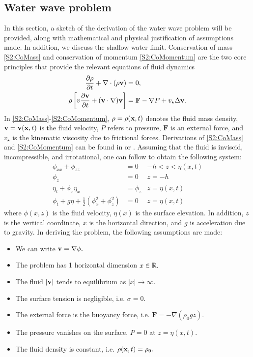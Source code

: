 \documentclass[11pt,reqno,oneside,a4paper]{article}
\begin{document}
\subsection{Water wave problem}
In this section, a sketch of the derivation of the water wave problem will be provided, along with mathematical and physical justification of assumptions made. In addition, we discuss the shallow water limit. Conservation of mass \eqref{S2:CoMass} and conservation of momentum \eqref{S2:CoMomentum} are the two core principles that provide the relevant equations of fluid dynamics
\begin{align}
\frac{\partial \rho}{\partial t} + \nabla \cdot (\rho {\bf v}) &= 0, \label{S2:CoMass} \\
\rho\left[ v\frac{\partial {\bf v}}{\partial t} + ({\bf v} \cdot \nabla) {\bf v}\right] &= \textbf{F} - \nabla P + v_{\star} \Delta {\bf v}. \label{S2:CoMomentum}
\end{align}
In \eqref{S2:CoMass}-\eqref{S2:CoMomentum}, $\rho = \rho({\bf x}, t)$ denotes the fluid mass density, ${\bf v} = {\bf v}({\bf x},t)$ is the fluid velocity, $P$ refers to pressure, $\textbf{F}$ is an external force, and $v_{\star}$ is the kinematic viscosity due to frictional forces. Derivations of \eqref{S2:CoMass} and \eqref{S2:CoMomentum} can be found in \cite[Chapter 3]{Johnson} or \cite[Chapter 1]{CM}. Assuming that the fluid is inviscid, incompressible, and irrotational, one can follow \cite[Section 5.1]{Ablowitz} to obtain the following system:
\begin{subequations} \label{S2:DimWholeLineProblem}
\begin{align}
\phi_{xx} + \phi_{zz} &= 0 &-h < z < \eta(x,t) \label{S2:PDE}\\
\phi_{z} &= 0 &z = -h \label{S2:BBC}\\
\eta_t + \phi_{x}\eta_{x} &= \phi_{z} & z = \eta(x,t) \label{S2:KBC}\\
\phi_t + g\eta + \frac{1}{2}(\phi_{x}^2 + \phi_{z}^2) &= 0 &z = \eta(x,t) \label{S2:DBC}
\end{align}
\end{subequations}
where $\phi(x,z)$ is the fluid velocity, $\eta(x)$ is the surface elevation. In addition, $z$ is the vertical coordinate, $x$ is the horizontal direction, and $g$ is acceleration due to gravity. In deriving the problem, the following assumptions are made:
\begin{itemize}
\item We can write ${\bf v} = \nabla \phi.$
\item The problem has 1 horizontal dimension $x \in \mathbb R.$
\item The fluid $|{\bf v}|$ tends to equilibrium as $|x| \to \infty.$
\item The surface tension is negligible, i.e. $\sigma = 0.$ 
\item The external force is the buoyancy force, i.e. $\textbf{F} = - \nabla (\rho_0 g z).$
\item The pressure vanishes on the surface, $P = 0$ at $z = \eta(x,t).$
\item The fluid density is constant, i.e. $\rho({\bf x},t) = \rho_0.$
\end{itemize}
\end{document}
